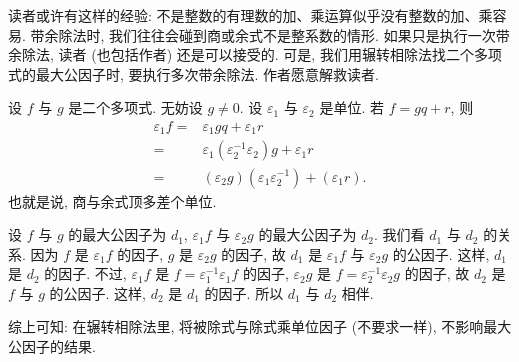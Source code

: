 \begin{remark}
    读者或许有这样的经验: 不是整数的有理数的加、乘运算似乎没有整数的加、乘容易. 带余除法时, 我们往往会碰到商或余式不是整系数的情形. 如果只是执行一次带余除法, 读者 (也包括作者) 还是可以接受的. 可是, 我们用辗转相除法找二个多项式的最大公因子时, 要执行多次带余除法. 作者愿意解救读者.

    设 $f$ 与 $g$ 是二个多项式. 无妨设 $g \neq 0$. 设 $\varepsilon_1$ 与 $\varepsilon_2$ 是单位. 若 $f = gq + r$, 则
    \begin{align*}
        \varepsilon_1 f
        = {} & \varepsilon_1 gq + \varepsilon_1 r                                        \\
        = {} & \varepsilon_1 (\varepsilon_2^{-1} \varepsilon_2) g + \varepsilon_1 r      \\
        = {} & (\varepsilon_2 g) (\varepsilon_1 \varepsilon_2^{-1}) + (\varepsilon_1 r).
    \end{align*}
    也就是说, 商与余式顶多差个单位.

    设 $f$ 与 $g$ 的最大公因子为 $d_1$, $\varepsilon_1 f$ 与 $\varepsilon_2 g$ 的最大公因子为 $d_2$. 我们看 $d_1$ 与 $d_2$ 的关系. 因为 $f$ 是 $\varepsilon_1 f$ 的因子, $g$ 是 $\varepsilon_2 g$ 的因子, 故 $d_1$ 是 $\varepsilon_1 f$ 与 $\varepsilon_2 g$ 的公因子. 这样, $d_1$ 是 $d_2$ 的因子. 不过, $\varepsilon_1 f$ 是 $f = \varepsilon_1^{-1} \varepsilon_1 f$ 的因子, $\varepsilon_2 g$ 是 $f = \varepsilon_2^{-1} \varepsilon_2 g$ 的因子, 故 $d_2$ 是 $f$ 与 $g$ 的公因子. 这样, $d_2$ 是 $d_1$ 的因子. 所以 $d_1$ 与 $d_2$ 相伴.

    综上可知: 在辗转相除法里, 将被除式与除式乘单位因子 (不要求一样), 不影响最大公因子的结果.
\end{remark}

